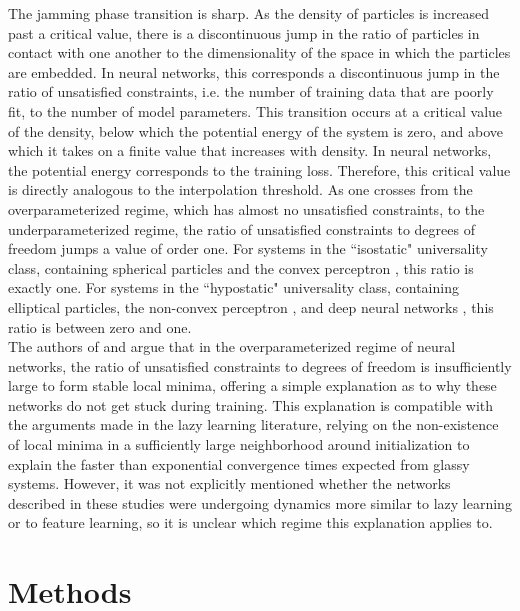 \documentclass[11pt]{article}
\begin{document}
The jamming phase transition is sharp. As the density of particles is increased past a critical value, there is a discontinuous jump in the ratio of particles in contact with one another to the dimensionality of the space in which the particles are embedded. In neural networks, this corresponds a discontinuous jump in the ratio of unsatisfied constraints, i.e. the number of training data that are poorly fit, to the number of model parameters. This transition occurs at a critical value of the density, below which the potential energy of the system is zero, and above which it takes on a finite value that increases with density. In neural networks, the potential energy corresponds to the training loss. Therefore, this critical value is directly analogous to the interpolation threshold. As one crosses from the overparameterized regime, which has almost no unsatisfied constraints, to the underparameterized regime, the ratio of unsatisfied constraints to degrees of freedom jumps a value of order one. For systems in the ``isostatic" universality class, containing spherical particles and the convex perceptron \cite{franzSimplestModelJamming2016}, this ratio is exactly one. For systems in the ``hypostatic" universality class, containing elliptical particles, the non-convex perceptron \cite{franzSimplestModelJamming2016}, and deep neural networks \cite{geigerJammingTransitionParadigm2019,spiglerJammingTransitionOverparametrization2019}, this ratio is between zero and one. \\

The authors of \cite{geigerJammingTransitionParadigm2019} and \cite{spiglerJammingTransitionOverparametrization2019} argue that in the overparameterized regime of neural networks, the ratio of unsatisfied constraints to degrees of freedom is insufficiently large to form stable local minima, offering a simple explanation as to why these networks do not get stuck during training. This explanation is compatible with the arguments made in the lazy learning literature, relying on the non-existence of local minima in a sufficiently large neighborhood around initialization to explain the faster than exponential convergence times expected from glassy systems. However, it was not explicitly mentioned whether the networks described in these studies were undergoing dynamics more similar to lazy learning or to feature learning, so it is unclear which regime this explanation applies to.

\section{Methods}
\label{Methods}
\end{document}

